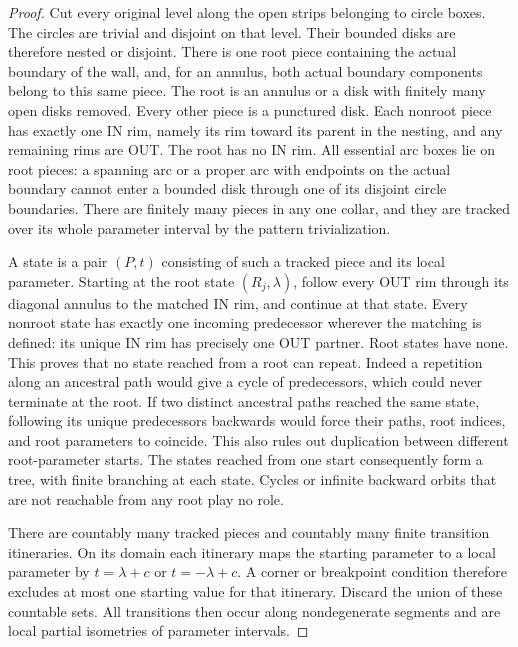 \begin{proof}
Cut every original level along the open strips belonging to circle boxes.
The circles are trivial and disjoint on that level.  Their bounded disks
are therefore nested or disjoint.  There is one root piece containing the
actual boundary of the wall, and, for an annulus, both actual boundary
components belong to this same piece.  The root is an annulus or a disk with
finitely many open disks removed.  Every other piece is a punctured disk.
Each nonroot piece has exactly one IN rim, namely its rim toward its parent
in the nesting, and any remaining rims are OUT.  The root has no IN rim.
All essential arc boxes lie on root pieces: a spanning arc or a proper arc
with endpoints on the actual boundary cannot enter a bounded disk through
one of its disjoint circle boundaries.  There are finitely many pieces in
any one collar, and they are tracked over its whole parameter interval by
the pattern trivialization.

A state is a pair $(P,t)$ consisting of such a tracked piece and its local
parameter.  Starting at the root state $(R_j,\lambda)$, follow every OUT rim
through its diagonal annulus to the matched IN rim, and continue at that
state.  Every nonroot state has exactly one incoming predecessor wherever
the matching is defined: its unique IN rim has precisely one OUT partner.
Root states have none.  This proves that no state reached from a root can
repeat.  Indeed a repetition along an ancestral path would give a cycle of
predecessors, which could never terminate at the root.  If two distinct
ancestral paths reached the same state, following its unique predecessors
backwards would force their paths, root indices, and root parameters to
coincide.  This also rules out duplication between different root-parameter
starts.  The states reached from one start consequently form a tree, with
finite branching at each state.  Cycles or infinite backward orbits that
are not reachable from any root play no role.

There are countably many tracked pieces and countably many finite transition
itineraries.  On its domain each itinerary maps the starting parameter to
a local parameter by $t=\lambda+c$ or $t=-\lambda+c$.  A corner or breakpoint
condition therefore excludes at most one starting value for that itinerary.
Discard the union of these countable sets.  All transitions then occur along
nondegenerate segments and are local partial isometries of parameter
intervals.


\end{proof}
